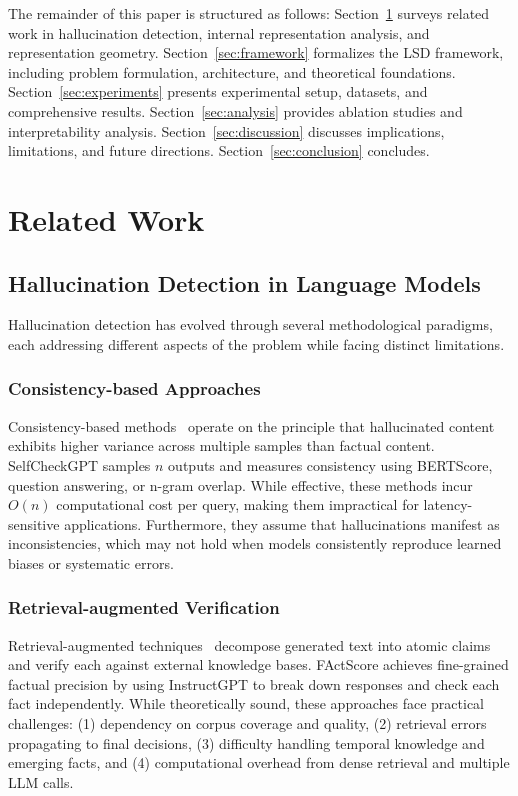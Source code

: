 \documentclass[11pt]{article}
\begin{document}
The remainder of this paper is structured as follows: Section~\ref{sec:related} surveys related work in hallucination detection, internal representation analysis, and representation geometry. Section~\ref{sec:framework} formalizes the LSD framework, including problem formulation, architecture, and theoretical foundations. Section~\ref{sec:experiments} presents experimental setup, datasets, and comprehensive results. Section~\ref{sec:analysis} provides ablation studies and interpretability analysis. Section~\ref{sec:discussion} discusses implications, limitations, and future directions. Section~\ref{sec:conclusion} concludes.

\section{Related Work}
\label{sec:related}

\subsection{Hallucination Detection in Language Models}

Hallucination detection has evolved through several methodological paradigms, each addressing different aspects of the problem while facing distinct limitations.

\subsubsection{Consistency-based Approaches}

Consistency-based methods~\cite{manakul2023selfcheckgpt} operate on the principle that hallucinated content exhibits higher variance across multiple samples than factual content. SelfCheckGPT samples $n$ outputs and measures consistency using BERTScore, question answering, or n-gram overlap. While effective, these methods incur $O(n)$ computational cost per query, making them impractical for latency-sensitive applications. Furthermore, they assume that hallucinations manifest as inconsistencies, which may not hold when models consistently reproduce learned biases or systematic errors.

\subsubsection{Retrieval-augmented Verification}

Retrieval-augmented techniques~\cite{min2023factscore, peng2023check} decompose generated text into atomic claims and verify each against external knowledge bases. FActScore achieves fine-grained factual precision by using InstructGPT to break down responses and check each fact independently. While theoretically sound, these approaches face practical challenges: (1) dependency on corpus coverage and quality, (2) retrieval errors propagating to final decisions, (3) difficulty handling temporal knowledge and emerging facts, and (4) computational overhead from dense retrieval and multiple LLM calls.
\end{document}
